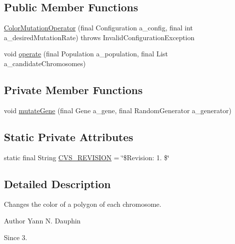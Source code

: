 \subsection*{Public Member Functions}
\begin{DoxyCompactItemize}
\item 
\hyperlink{classexamples_1_1monalisa_1_1core_1_1_color_mutation_operator_a57c1bbb0ac687a1162358f8ace9925d5}{Color\-Mutation\-Operator} (final Configuration a\-\_\-config, final int a\-\_\-desired\-Mutation\-Rate)  throws Invalid\-Configuration\-Exception 
\item 
void \hyperlink{classexamples_1_1monalisa_1_1core_1_1_color_mutation_operator_a1143ed54d24aa0d922111a8bede53f0d}{operate} (final Population a\-\_\-population, final List a\-\_\-candidate\-Chromosomes)
\end{DoxyCompactItemize}
\subsection*{Private Member Functions}
\begin{DoxyCompactItemize}
\item 
void \hyperlink{classexamples_1_1monalisa_1_1core_1_1_color_mutation_operator_a72784622a656b4f31b562407c6036bd0}{mutate\-Gene} (final Gene a\-\_\-gene, final Random\-Generator a\-\_\-generator)
\end{DoxyCompactItemize}
\subsection*{Static Private Attributes}
\begin{DoxyCompactItemize}
\item 
static final String \hyperlink{classexamples_1_1monalisa_1_1core_1_1_color_mutation_operator_a2f8c7e3d6be4315ac2bfb40af4c5af46}{C\-V\-S\-\_\-\-R\-E\-V\-I\-S\-I\-O\-N} = \char`\"{}\$Revision\-: 1. \$\char`\"{}
\end{DoxyCompactItemize}


\subsection{Detailed Description}
Changes the color of a polygon of each chromosome.

\begin{DoxyAuthor}{Author}
Yann N. Dauphin 
\end{DoxyAuthor}
\begin{DoxySince}{Since}
3. 
\end{DoxySince}


